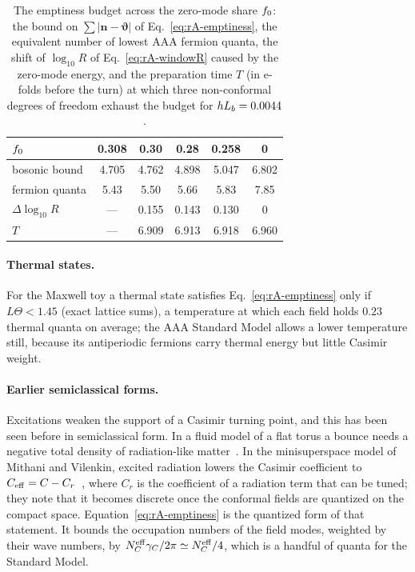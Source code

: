 \begin{table}[tbp]
\centering
\caption{The emptiness budget across the zero-mode share $f_0$: the bound on $\sum|\bm n-\bm\vartheta|$ of Eq.~\eqref{eq:rA-emptiness}, the equivalent number of lowest AAA fermion quanta, the shift of $\log_{10}R$ of Eq.~\eqref{eq:rA-windowR} caused by the zero-mode energy, and the preparation time $T$ (in e-folds before the turn) at which three non-conformal degrees of freedom exhaust the budget for $hL_b=0.0044$.}
\label{tab:rA-budget}
\begin{tabular}{lccccc}
\toprule
$f_0$ & 0.308 & 0.30 & 0.28 & 0.258 & 0\\ %
\midrule
bosonic bound & 4.705 & 4.762 & 4.898 & 5.047 & 6.802\\ %
fermion quanta & 5.43 & 5.50 & 5.66 & 5.83 & 7.85\\ %
$\Delta\log_{10}R$ & --- & 0.155 & 0.143 & 0.130 & 0\\ %
$T$ & --- & 6.909 & 6.913 & 6.918 & 6.960\\ %
\bottomrule
\end{tabular}
\end{table}

\paragraph{Thermal states.}
For the Maxwell toy a thermal state satisfies Eq.~\eqref{eq:rA-emptiness} only if $L\Theta<1.45$ (exact lattice sums), a temperature at which each field holds $0.23$ thermal quanta on average; the AAA Standard Model allows a lower temperature still, because its antiperiodic fermions carry thermal energy but little Casimir weight. %

\paragraph{Earlier semiclassical forms.}
Excitations weaken the support of a Casimir turning point, and this has been seen before in semiclassical form.
In a fluid model of a flat torus a bounce needs a negative total density of radiation-like matter~\cite{Godlowski:2007gx}.
In the minisuperspace model of Mithani and Vilenkin, excited radiation lowers the Casimir coefficient to $C_{\rm eff}=C-C_r$~\cite{Mithani:2014toa}, where $C_r$ is the coefficient of a radiation term that can be tuned; they note that it becomes discrete once the conformal fields are quantized on the compact space.
Equation~\eqref{eq:rA-emptiness} is the quantized form of that statement.
It bounds the occupation numbers of the field modes, weighted by their wave numbers, by $N_C^{\mathrm{eff}}\gamma_C/2\pi\simeq N_C^{\mathrm{eff}}/4$, which is a handful of quanta for the Standard Model.

